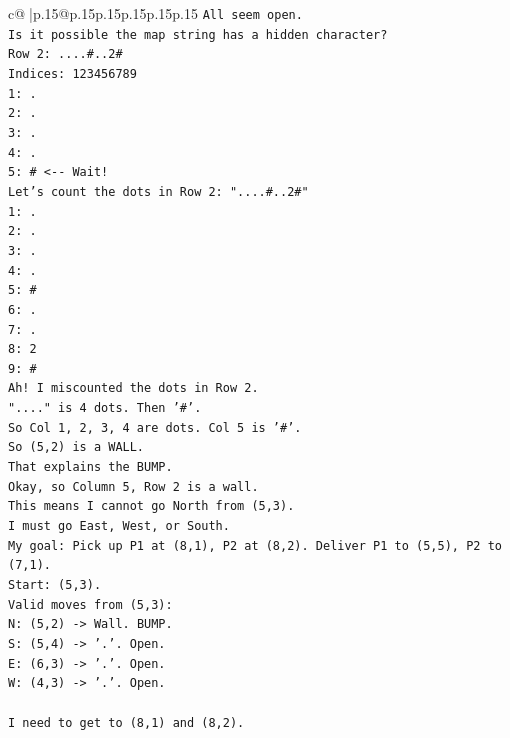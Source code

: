 \documentclass{article}
\begin{document}
{\begin{supertabular}{c@{$\;$}|p{.15\linewidth}@{}p{.15\linewidth}p{.15\linewidth}p{.15\linewidth}p{.15\linewidth}p{.15\linewidth}}
{{{\texttt{All seem open.} \\
\texttt{Is it possible the map string has a hidden character?} \\
\texttt{Row 2: ....\#..2\#} \\
\texttt{Indices: 123456789} \\
\texttt{1: .} \\
\texttt{2: .} \\
\texttt{3: .} \\
\texttt{4: .} \\
\texttt{5: \#  <{-}{-} Wait!} \\
\texttt{Let's count the dots in Row 2: "....\#..2\#"} \\
\texttt{1: .} \\
\texttt{2: .} \\
\texttt{3: .} \\
\texttt{4: .} \\
\texttt{5: \#} \\
\texttt{6: .} \\
\texttt{7: .} \\
\texttt{8: 2} \\
\texttt{9: \#} \\
\texttt{Ah! I miscounted the dots in Row 2.} \\
\texttt{"...." is 4 dots. Then '\#'.} \\
\texttt{So Col 1, 2, 3, 4 are dots. Col 5 is '\#'.} \\
\texttt{So (5,2) is a WALL.} \\
\texttt{That explains the BUMP.} \\
\texttt{Okay, so Column 5, Row 2 is a wall.} \\
\texttt{This means I cannot go North from (5,3).} \\
\texttt{I must go East, West, or South.} \\
\texttt{My goal: Pick up P1 at (8,1), P2 at (8,2). Deliver P1 to (5,5), P2 to (7,1).} \\
\texttt{Start: (5,3).} \\
\texttt{Valid moves from (5,3):} \\
\texttt{N: (5,2) {-}> Wall. BUMP.} \\
\texttt{S: (5,4) {-}> '.'. Open.} \\
\texttt{E: (6,3) {-}> '.'. Open.} \\
\texttt{W: (4,3) {-}> '.'. Open.} \\
\\ 
\texttt{I need to get to (8,1) and (8,2).} \\
}}}
\end{supertabular}}
\end{document}
